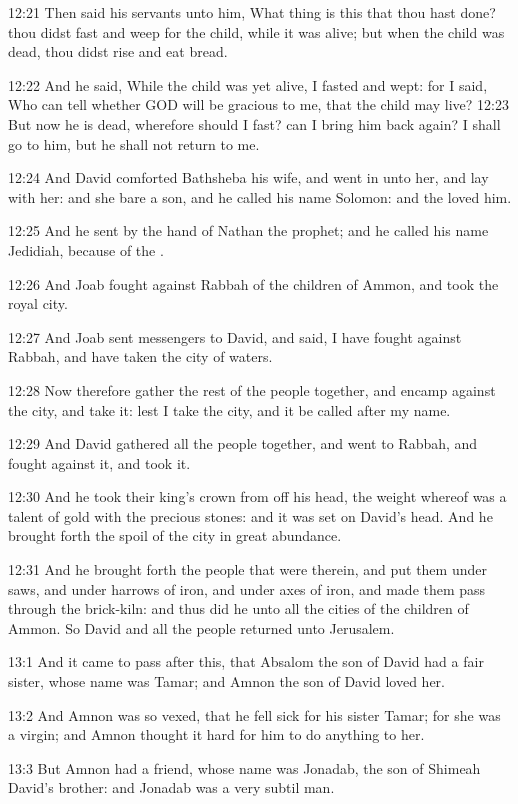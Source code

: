 12:21 Then said his servants unto him, What thing is this that thou
hast done? thou didst fast and weep for the child, while it was alive;
but when the child was dead, thou didst rise and eat bread.

12:22 And he said, While the child was yet alive, I fasted and wept:
for I said, Who can tell whether GOD will be gracious to me, that the
child may live?  12:23 But now he is dead, wherefore should I fast?
can I bring him back again? I shall go to him, but he shall not return
to me.

12:24 And David comforted Bathsheba his wife, and went in unto her,
and lay with her: and she bare a son, and he called his name Solomon:
and the \LORD loved him.

12:25 And he sent by the hand of Nathan the prophet; and he called his
name Jedidiah, because of the \LORD.

12:26 And Joab fought against Rabbah of the children of Ammon, and
took the royal city.

12:27 And Joab sent messengers to David, and said, I have fought
against Rabbah, and have taken the city of waters.

12:28 Now therefore gather the rest of the people together, and encamp
against the city, and take it: lest I take the city, and it be called
after my name.

12:29 And David gathered all the people together, and went to Rabbah,
and fought against it, and took it.

12:30 And he took their king's crown from off his head, the weight
whereof was a talent of gold with the precious stones: and it was set
on David's head. And he brought forth the spoil of the city in great
abundance.

12:31 And he brought forth the people that were therein, and put them
under saws, and under harrows of iron, and under axes of iron, and
made them pass through the brick-kiln: and thus did he unto all the
cities of the children of Ammon. So David and all the people returned
unto Jerusalem.

13:1 And it came to pass after this, that Absalom the son of David had
a fair sister, whose name was Tamar; and Amnon the son of David loved
her.

13:2 And Amnon was so vexed, that he fell sick for his sister Tamar;
for she was a virgin; and Amnon thought it hard for him to do anything
to her.

13:3 But Amnon had a friend, whose name was Jonadab, the son of
Shimeah David's brother: and Jonadab was a very subtil man.

